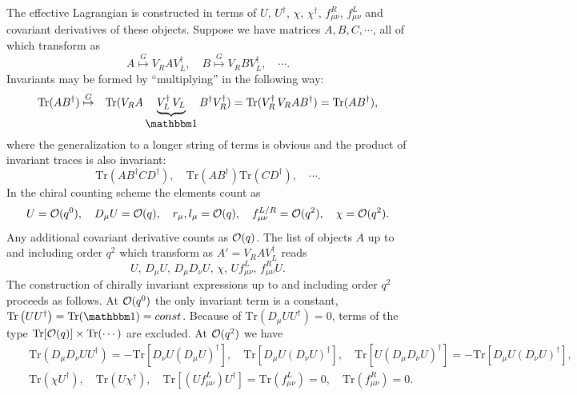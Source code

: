 \documentclass[twoside,12pt]{article}
\begin{document}
   The effective Lagrangian is constructed in terms of $U$,
$U^\dagger$, $\chi$, $\chi^\dagger$, $f^{R}_{\mu\nu}$,
$f^{L}_{\mu\nu}$ and covariant derivatives of these
objects.
   Suppose we have matrices $A,B,C,\cdots$, all of which transform as
\begin{displaymath}
A\stackrel{G}{\mapsto} V_R A V_L^\dagger, \quad
B\stackrel{G}{\mapsto} V_R B V_L^\dagger, \quad
\cdots.
\end{displaymath}
   Invariants may be formed by ``multiplying'' in the following way:
\begin{eqnarray*}
\mbox{Tr}(A B^\dagger)& \stackrel{G}{\mapsto} & \mbox{Tr}(V_R A
\underbrace{V_L^\dagger\, V_L}_{\mbox{$\mathbbm 1$}}  B^\dagger V_R^{\dagger})
=\mbox{Tr}( V_R^{\dagger}\, V_R A B^\dagger)=\mbox{Tr}(A B^\dagger),
\end{eqnarray*}
where the generalization to a longer string of terms is obvious
and the product of invariant traces is also invariant:
\begin{equation}
\label{3:2:3:chains} \mbox{Tr}(AB^\dagger C D^\dagger),\quad
\mbox{Tr}(A B^\dagger)\mbox{Tr}(C D^\dagger),\quad \cdots.
\end{equation}
   In the chiral counting scheme the elements count as
\begin{displaymath}
U={\cal O}(q^0),\quad
D_{\mu} U={\cal O}(q),\quad
r_{\mu},l_{\mu}={\cal O}(q),\quad
f^{L/R}_{\mu\nu}={\cal O}(q^2), \quad
\chi = {\cal O}(q^2).
\end{displaymath}
   Any additional covariant derivative counts as ${\cal O}(q)$.
   The list of objects $A$ up to and including order $q^2$ which
transform as $A'=V_R A V_L^{\dagger}$ reads
\begin{displaymath}
U,\, D_{\mu} U,\, D_{\mu} D_{\nu}U,\, \chi,\, U f^L_{\mu\nu},\,
f^R_{\mu\nu} U.
\end{displaymath}
   The construction of chirally invariant expressions up to and including
order $q^2$ proceeds as follows.
   At ${\cal O}(q^0)$ the only invariant term is a constant,
$\mbox{Tr}\left ( U U^{\dagger} \right ) =
\mbox{Tr} ( {\mathbbm 1} ) = const$.
   Because of $\mbox{Tr}\left( D_{\mu} U U^{\dagger} \right) = 0$,
terms of the type $\mbox{Tr}[{\cal O}(q)] \times \mbox{Tr}(\cdots)$ are excluded.
   At ${\cal O}(q^2)$ we have
\begin{eqnarray*}
&&\mbox{Tr} \left (D_{\mu} D_{\nu} U U^{\dagger}
\right)
=-\mbox{Tr}\left[D_{\nu} U (D_{\mu} U)^{\dagger}\right],\quad
\mbox{Tr} \left [ D_{\mu} U (D_{\nu} U)^{\dagger} \right ],\quad
\mbox{Tr} \left [ U (D_{\mu} D_{\nu} U)^{\dagger} \right ]
=-\mbox{Tr}\left[D_{\mu} U (D_{\nu} U)^{\dagger}\right], \\
& & \mbox{Tr} \left ( \chi U^{\dagger} \right ),\quad
\mbox{Tr} \left ( U \chi^{\dagger} \right ),\quad
\mbox{Tr} \left [ (U f^L_{\mu\nu}) U^{\dagger} \right ]
= \mbox{Tr} \left ( f^L_{\mu\nu} \right )=0,\quad
\mbox{Tr} \left ( f^R_{\mu\nu} \right )=0.
\end{eqnarray*}
\end{document}
